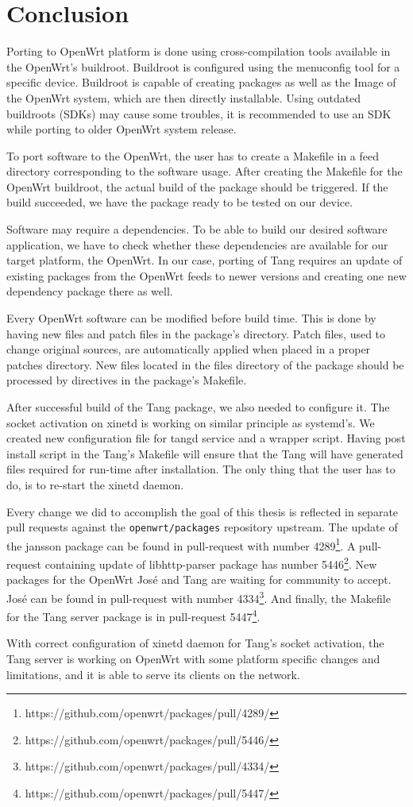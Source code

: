 \chapter{Conclusion}\label{conlusion}


Porting to OpenWrt platform is done using cross-compilation tools available in the OpenWrt's buildroot.
Buildroot is configured using the menuconfig tool for a specific device.
Buildroot is capable of creating packages as well as the Image of the OpenWrt system, which are then directly installable.
Using outdated buildroots (SDKs) may cause some troubles, it is recommended to use an SDK while porting to older OpenWrt system release.

To port software to the OpenWrt, the user has to create a Makefile in a feed directory corresponding to the software usage.
After creating the Makefile for the OpenWrt buildroot, the actual build of the package should be triggered.
If the build succeeded, we have the package ready to be tested on our device.

Software may require a dependencies.
To be able to build our desired software application, we have to check whether these dependencies are available for our target platform, the OpenWrt.
In our case, porting of Tang requires an update of existing packages from the OpenWrt feeds to newer versions and creating one new dependency package there as well.

Every OpenWrt software can be modified before build time.
This is done by having new files and patch files in the package's directory.
Patch files, used to change original sources, are automatically applied when placed in a proper patches directory.
New files located in the files directory of the package should be processed by directives in the package's Makefile.

After successful build of the Tang package, we also needed to configure it.
The socket activation on xinetd is working on similar principle as systemd's.
We created new configuration file for tangd service and a wrapper script.
Having post install script in the Tang's Makefile will ensure that the Tang will have generated files required for run-time after installation.
The only thing that the user has to do, is to re-start the xinetd daemon.

Every change we did to accomplish the goal of this thesis is reflected in separate pull requests against the {\tt openwrt/packages} repository upstream.
The update of the jansson package can be found in pull-request with number 4289\footnote{https://github.com/openwrt/packages/pull/4289/}.
A pull-request containing update of libhttp-parser package has number 5446\footnote{https://github.com/openwrt/packages/pull/5446/}.
New packages for the OpenWrt José and Tang are waiting for community to accept.
José can be found in pull-request with number 4334\footnote{https://github.com/openwrt/packages/pull/4334/}.
And finally, the Makefile for the Tang server package is in pull-request 5447\footnote{https://github.com/openwrt/packages/pull/5447/}.

With correct configuration of xinetd daemon for Tang's socket activation, the Tang server is working on OpenWrt with some platform specific changes and limitations, and it is able to serve its clients on the network.
